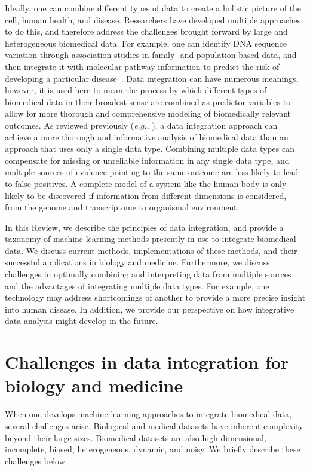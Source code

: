 \documentclass[5p]{elsarticle}
\newcommand{\eg}{\emph{e.g.}\xspace}
\newcommand{\rev}[1]{{\color{black}#1}}
\begin{document}
Ideally, \rev{one} can combine different types of data to create a holistic picture of the cell, human health, and disease.
Researchers have developed multiple approaches to do this, and therefore address the challenges brought forward by large and heterogeneous biomedical data.
For example, one can identify DNA sequence variation through association studies in family- and population-based data, and then integrate it with molecular pathway information to predict the risk of developing a particular disease~\cite{Chatterjee2013projecting}.
\rev{Data integration can have numerous meanings, however, it is used here to mean} the process by which different types of biomedical data in their broadest sense are combined as predictor variables to allow for more thorough and comprehensive modeling of biomedically relevant outcomes.
As reviewed previously (\eg, \cite{Ritchie2015methods,Karczewski2018integrative,Teschendorff2018review}), a data integration approach can achieve a more thorough and informative analysis of biomedical data than an approach that uses only a single data type.
Combining multiple data types can compensate for missing or unreliable information in any single data type, and multiple sources of evidence pointing to the same outcome are less likely to lead to false positives.
\rev{A complete model of a system like the human body is only likely to be discovered if information from different dimensions is considered,} from the genome and transcriptome to organismal environment.

In this Review, we describe the principles of data integration, and provide a taxonomy of machine learning methods pre\-sen\-tly in use to integrate biomedical data.
We discuss current methods, implementations of these methods, and their successful applications in biology and medicine.
Furthermore, we discuss challenges in optimally combining and interpreting data from multiple sources and the advantages of integrating multiple data types.
For example, one technology may address shortcomings of another to provide a more precise insight into human disease.
In addition, we provide our perspective on how integrative data analysis might develop in the future.


\section{Challenges in data integration for biology and medicine}

When one develops machine learning approaches to integrate biomedical data, several challenges arise.
Biological and medical datasets have inherent complexity beyond their large sizes.
Biomedical datasets are also high-dimensional, incomplete, biased, heterogeneous, dynamic, and noisy.
We briefly describe these challenges below.
\end{document}
